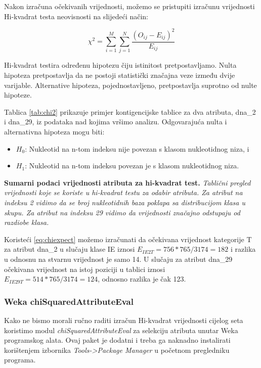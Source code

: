 Nakon izračuna očekivanih vrijednosti, možemo se pristupiti izračunu vrijednosti Hi-kvadrat testa neovisnosti na slijedeći način:

\begin{equation}
    \chi^2 = \sum_{i=1}^{M}\sum_{j=1}^{N}\frac{(O_{ij}-E_{ij})^2}{E_{ij}}
\end{equation}

Hi-kvadrat testira određenu hipotezu čiju istinitost pretpostavljamo. Nulta hipoteza pretpostavlja da ne postoji statistički značajna veze između dvije varijable. Alternative hipoteza, pojednostavljeno, pretpostavlja suprotno od nulte hipoteze.

Tablica \ref{tab:chi2} prikazuje primjer kontigencijske tablice za dva atributa, dna{\_2} i dna{\_}29, iz podataka nad kojima vršimo analizu. Odgovarajuća nulta i alternativna hipoteza mogu biti:
\begin{itemize}
    \item $H_0$: Nukleotid na n-tom indeksu nije povezan s klasom nukleotidnog niza, i 
    \item $H_1$: Nukleotid na n-tom indeksu povezan je s klasom nukleotidnog niza.
\end{itemize}

\begin{table}
\centering
    \caption[Sumarni podaci vrijednosti atributa za hi-kvadrat test]{\textbf{Sumarni podaci vrijednosti atributa za hi-kvadrat test.} \textit{Tablični pregled vrijednosti koje se koriste u hi-kvadrat testu za odabir atributa. Za atribut na indeksu 2 vidimo da se broj nukleotidnih baza poklapa sa distribucijom klasa u skupu. Za atribut na indeksu 29 vidimo da vrijednosti značajno odstupaju od razdiobe klasa.}}
    \label{tab:chi2}
\end{table}
Koristeći \eqref{eq:chiexpect} možemo izračunati da očekivana vrijednost kategorije T za atribut dna{\_}2 u slučaju klase IE iznosi $E_{IE2T} = 756*765/3174 = 182$ i razlika u odnosnu na stvarnu vrijednost je samo 14. U slučaju za atribut dna{\_}29 očekivana vrijednost na istoj poziciji u tablici iznosi $E_{IE29T} = 514*765/3174 = 124$, odnosno razlika je čak 123.

\subsubsection*{Weka chiSquaredAttributeEval}
Kako ne bismo morali ručno raditi izračun Hi-kvadrat vrijednosti cijelog seta koristimo modul \textit{chiSquaredAttributeEval} za selekciju atributa unutar Weka programskog alata. Ovaj paket je dodatni i treba ga naknadno instalirati korištenjem izbornika \textit{Tools->Package Manager} u početnom pregledniku programa.
